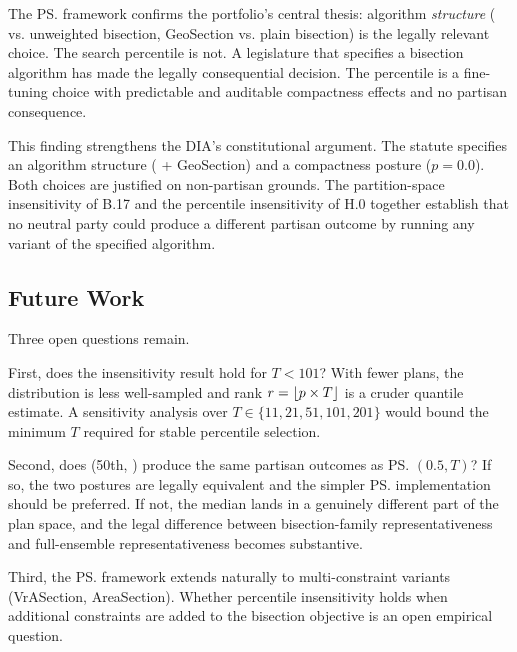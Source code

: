The \ps{} framework confirms the portfolio's central thesis: algorithm
\emph{structure} (\ar{} vs. unweighted bisection, GeoSection vs. plain
bisection) is the legally relevant choice.
The search percentile is not.
A legislature that specifies a bisection algorithm has made the legally
consequential decision.
The percentile is a fine-tuning choice with predictable and auditable
compactness effects and no partisan consequence.

This finding strengthens the DIA's constitutional argument.
The statute specifies an algorithm structure (\ar{} + GeoSection) and a
compactness posture ($p = 0.0$).
Both choices are justified on non-partisan grounds.
The partition-space insensitivity of B.17 and the percentile insensitivity
of H.0 together establish that no neutral party could produce a different
partisan outcome by running any variant of the specified algorithm.

\subsection{Future Work}

Three open questions remain.

First, does the insensitivity result hold for $T < 101$?
With fewer plans, the distribution is less well-sampled and rank $r =
\lfloor p \times T \rfloor$ is a cruder quantile estimate.
A sensitivity analysis over $T \in \{11, 21, 51, 101, 201\}$ would
bound the minimum $T$ required for stable percentile selection.

Second, does \ts{}(50th, \recom{}) produce the same partisan outcomes as
\ps{}$(0.5, T)$?
If so, the two postures are legally equivalent and the simpler \ps{}
implementation should be preferred.
If not, the \recom{} median lands in a genuinely different part of the plan
space, and the legal difference between bisection-family representativeness
and full-ensemble representativeness becomes substantive.

Third, the \ps{} framework extends naturally to multi-constraint variants
(VrASection, AreaSection).
Whether percentile insensitivity holds when additional constraints are added
to the bisection objective is an open empirical question.
